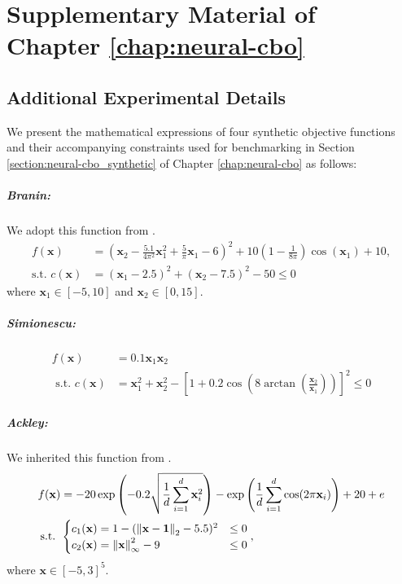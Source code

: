 \chapter{Supplementary Material of Chapter \ref{chap:neural-cbo}} 
\label{section:neural-cbo_supp}
\section{Additional Experimental Details}
\label{section:neural-cbo_experiments_synthetic}
We present the mathematical expressions of four synthetic objective functions and their accompanying constraints used for benchmarking in Section \ref{section:neural-cbo_synthetic} of Chapter \ref{chap:neural-cbo} as follows:
\paragraph{Branin:} We adopt this function from \citet{letham2019constrained}.
\begin{align*}
f(\mathbf{x}) &= \left( \mathbf{x}_2 - \frac{5.1}{4 \pi^2} \mathbf{x}_1^2 + \frac{5}{\pi} \mathbf{x}_1 - 6 \right)^2 + 10 \left( 1 - \frac{1}{8\pi} \right) \cos(\mathbf{x}_1) + 10,
\\
\text{s.t. } c(\mathbf{x}) &= (\mathbf{x}_1 - 2.5)^2 + (\mathbf{x}_2 - 7.5)^2 - 50 \le 0 
\end{align*}
where \( \mathbf{x}_1 \in [-5, 10] \) and \( \mathbf{x}_2 \in [0, 15] \).
\paragraph{Simionescu:} 
\begin{align*}
    f(\mathbf{x}) &= 0.1\mathbf{x}_1 \mathbf{x}_2 
    \\
    \text{ s.t. }   c(\mathbf{x}) &= \mathbf{x}_1^2 + \mathbf{x}_2^2 - \left[ 1 + 0.2 \cos(8 \arctan\left( \frac{\mathbf{x}_2}{\mathbf{x}_1} \right)) \right]^2 \le 0
\end{align*}

\paragraph{Ackley:}  We inherited this function from \citet{zhang2023constrained}.
\begin{align*}
    f(\mathbf{x}) &= -20 \exp\left( -0.2 \sqrt{\frac{1}{d} \sum_{i=1}^{d} \mathbf{x}_i^2} \right)
- \exp\left( \frac{1}{d} \sum_{i=1}^{d} \cos(2 \pi \mathbf{x}_i) \right) + 20 + e
    \\
    \text{s.t. } &  \begin{cases} 
    c_1 (\mathbf{x}) = 1 - (\norm{\mathbf{x}-\mathbf{1}}_2 - 5.5)^2  & \le 0 
    \\
    c_2 (\mathbf{x}) = \norm{\mathbf{x}}_\infty^2 - 9 & \le 0
    \end{cases},
\end{align*} where $\mathbf{x} \in [-5,3]^5$. 
